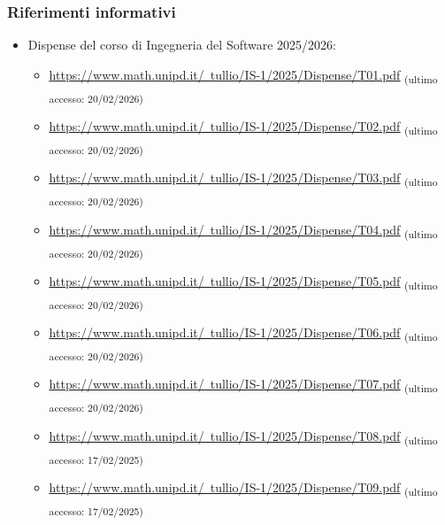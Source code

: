 \documentclass[a4paper,12pt]{article}
\newcommand{\ped}[1]{\textsubscript{#1}}
\begin{document}
\subsubsection{Riferimenti informativi}
\begin{itemize}
    \item Dispense del corso di Ingegneria del Software 2025/2026:
          \begin{itemize}
              \item \href{https://www.math.unipd.it/~tullio/IS-1/2025/Dispense/T01.pdf}{\ul{https://www.math.unipd.it/~tullio/IS-1/2025/Dispense/T01.pdf}} \ped{(ultimo accesso: 20/02/2026)}
              \item \href{https://www.math.unipd.it/~tullio/IS-1/2025/Dispense/T02.pdf}{\ul{https://www.math.unipd.it/~tullio/IS-1/2025/Dispense/T02.pdf}} \ped{(ultimo accesso: 20/02/2026)}
              \item \href{https://www.math.unipd.it/~tullio/IS-1/2025/Dispense/T03.pdf}{\ul{https://www.math.unipd.it/~tullio/IS-1/2025/Dispense/T03.pdf}} \ped{(ultimo accesso: 20/02/2026)}
              \item \href{https://www.math.unipd.it/~tullio/IS-1/2025/Dispense/T04.pdf}{\ul{https://www.math.unipd.it/~tullio/IS-1/2025/Dispense/T04.pdf}} \ped{(ultimo accesso: 20/02/2026)}
              \item \href{https://www.math.unipd.it/~tullio/IS-1/2025/Dispense/T05.pdf}{\ul{https://www.math.unipd.it/~tullio/IS-1/2025/Dispense/T05.pdf}} \ped{(ultimo accesso: 20/02/2026)}
              \item \href{https://www.math.unipd.it/~tullio/IS-1/2025/Dispense/T06.pdf}{\ul{https://www.math.unipd.it/~tullio/IS-1/2025/Dispense/T06.pdf}} \ped{(ultimo accesso: 20/02/2026)}
              \item \href{https://www.math.unipd.it/~tullio/IS-1/2025/Dispense/T07.pdf}{\ul{https://www.math.unipd.it/~tullio/IS-1/2025/Dispense/T07.pdf}} \ped{(ultimo accesso: 20/02/2026)}
              \item \href{https://www.math.unipd.it/~tullio/IS-1/2025/Dispense/T08.pdf}{\ul{https://www.math.unipd.it/~tullio/IS-1/2025/Dispense/T08.pdf}} \ped{(ultimo accesso: 17/02/2025)}
              \item \href{https://www.math.unipd.it/~tullio/IS-1/2025/Dispense/T09.pdf}{\ul{https://www.math.unipd.it/~tullio/IS-1/2025/Dispense/T09.pdf}} \ped{(ultimo accesso: 17/02/2025)}

\end{itemize}
\end{itemize}
\end{document}
